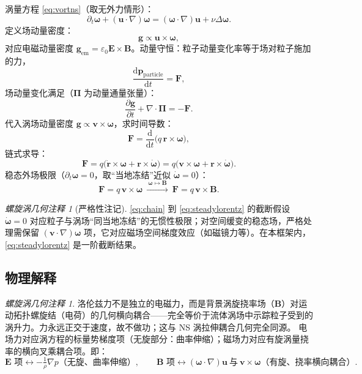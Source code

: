 \documentclass[11pt,a4paper]{article}
\newcommand{\dd}{\mathrm{d}}
\newcommand{\bu}{\bm{u}}
\newcommand{\bom}{\bm{\omega}}
\newcommand{\bF}{\bm{F}}
\newcommand{\bg}{\bm{g}}
\newcommand{\br}{\bm{r}}
\newcommand{\bB}{\bm{B}}
\newcommand{\bE}{\bm{E}}
\newcommand{\bv}{\bm{v}}
\newcommand{\bp}{\bm{p}}
\theoremstyle{remark}
\newtheorem{remark}[theorem]{螺旋涡几何注释}
\begin{document}
涡量方程 \eqref{eq:vortns}（取无外力情形）：
\begin{equation}
\partial_t\bom+(\bu\cdot\nabla)\bom=(\bom\cdot\nabla)\bu+\nu\Delta\bom.
\end{equation}
定义场动量密度：
\begin{equation}
\label{eq:momdens}
\bg\propto\bu\times\bom,
\end{equation}
对应电磁动量密度 $\bg_{\mathrm{em}}=\varepsilon_{0}\bE\times\bB$。动量守恒：粒子动量变化率等于场对粒子施加的力，
\begin{equation}
\frac{\dd\bp_{\mathrm{particle}}}{\dd t}=\bF,
\end{equation}
场动量变化满足（$\bm{\Pi}$ 为动量通量张量）：
\begin{equation}
\frac{\partial\bg}{\partial t}+\nabla\cdot\bm{\Pi}=-\bF.
\end{equation}
代入涡场动量密度 $\bg\propto\bv\times\bom$，求时间导数：
\begin{equation}
\bF=\frac{\dd}{\dd t}\bigl(q\,\br\times\bom\bigr),
\end{equation}
链式求导：
\begin{equation}
\label{eq:chain}
\bF=q\bigl(\dot{\br}\times\bom+\br\times\dot{\bom}\bigr)=q\bigl(\bv\times\bom+\br\times\dot{\bom}\bigr).
\end{equation}
稳态外场极限（$\partial_t\bom=0$，取“当地冻结”近似 $\dot{\bom}=0$）：
\begin{equation}
\label{eq:steadylorentz}
\bF=q\,\bv\times\bom\ \xrightarrow{\ \bom\mapsto\bB\ }\ \bF=q\,\bv\times\bB.
\end{equation}

\begin{remark}[严格性注记]
\eqref{eq:chain} 到 \eqref{eq:steadylorentz} 的截断假设 $\dot{\bom}=0$ 对应粒子与涡场“同当地冻结”的无惯性极限；对空间缓变的稳态场，严格处理需保留 $(\bv\cdot\nabla)\bom$ 项，它对应磁场空间梯度效应（如磁镜力等）。在本框架内，\eqref{eq:steadylorentz} 是一阶截断结果。
\end{remark}

\subsection{物理解释}

\begin{remark}
洛伦兹力不是独立的电磁力，而是背景涡旋挠率场（$\bB$）对运动拓扑螺旋结（电荷）的几何横向耦合——完全等价于流体涡场中示踪粒子受到的涡升力。力永远正交于速度，故不做功；这与 NS 涡拉伸耦合几何完全同源。
电场力对应涡方程的标量势梯度项（无旋部分：曲率伸缩）；磁场力对应有旋涡量挠率的横向叉乘耦合项。即：
\[
\bE\text{ 项}\longleftrightarrow -\tfrac1\rho\nabla p\text{（无旋、曲率伸缩）},\qquad
\bB\text{ 项}\longleftrightarrow (\bom\cdot\nabla)\bu\ \text{与}\ \bv\times\bom\text{（有旋、挠率横向耦合）}.
\]
\end{remark}
\end{document}
